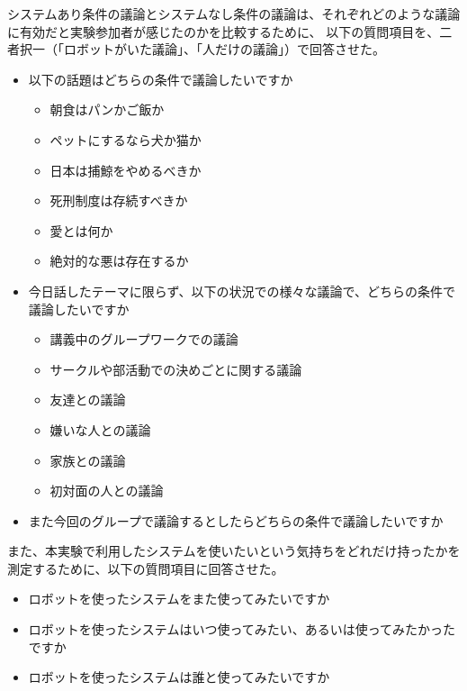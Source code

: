 \documentclass[11pt, a4paper]{jreport} %
\begin{document}
システムあり条件の議論とシステムなし条件の議論は、それぞれどのような議論に有効だと実験参加者が感じたのかを比較するために、
以下の質問項目を、二者択一（「ロボットがいた議論」、「人だけの議論」）で回答させた。
\begin{itemize}
\setlength{\parskip}{-0.1cm} %
  \setlength{\itemsep}{-0.1cm} %
\item 以下の話題はどちらの条件で議論したいですか
\begin{itemize}
\setlength{\parskip}{-0.1cm} %
  \setlength{\itemsep}{-0.1cm} %
\item 朝食はパンかご飯か
\item ペットにするなら犬か猫か
\item 日本は捕鯨をやめるべきか
\item 死刑制度は存続すべきか
\item 愛とは何か
\item 絶対的な悪は存在するか
\end{itemize}
\item 今日話したテーマに限らず、以下の状況での様々な議論で、どちらの条件で議論したいですか
\begin{itemize}
\setlength{\parskip}{-0.1cm} %
  \setlength{\itemsep}{-0.1cm} %
\item 講義中のグループワークでの議論
\item サークルや部活動での決めごとに関する議論
\item 友達との議論
\item 嫌いな人との議論
\item 家族との議論
\item 初対面の人との議論
\end{itemize}
\item また今回のグループで議論するとしたらどちらの条件で議論したいですか
\end{itemize}


また、本実験で利用したシステムを使いたいという気持ちをどれだけ持ったかを測定するために、以下の質問項目に回答させた。
\begin{itemize}
\setlength{\parskip}{-0.1cm} %
  \setlength{\itemsep}{-0.1cm} %
\item ロボットを使ったシステムをまた使ってみたいですか
\item ロボットを使ったシステムはいつ使ってみたい、あるいは使ってみたかったですか
\item ロボットを使ったシステムは誰と使ってみたいですか
\end{itemize}
\end{document}
